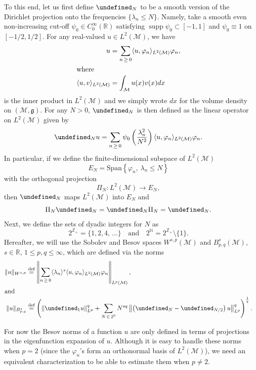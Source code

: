 \documentclass[10pt]{amsart}
\theoremstyle{definition}\newtheorem{defi}[theo]{Definition}\newtheorem{rema}[theo]{Remark}\newtheorem{exam}[theo]{Example}\newtheorem{exem}[theo]{Example}\newtheorem{nota}[theo]{Notation}
\newcommand{\Z}{\mathbb{Z}}
\newcommand{\R}{\mathbb{R}}
\newcommand{\N}{\mathbb{N}}
\DeclareMathOperator*{\supp}{supp}
\newcommand{\deff}{\overset{\textup{def}}{=}}
\let\P= \undefined
\newcommand{\P}{\mathbf{P}}
\newcommand{\M}{\mathcal{M}}
\newcommand{\Span}{\mathrm{Span}}
\newcommand{\g}{\mathfrak{g}}
\newcommand{\jb}[1] {\langle #1 \rangle}
\begin{document}
To this end, let us first define $\P_N$ to be a smooth version of the Dirichlet projection onto the frequencies $\{\lambda_n\leq N\}$. Namely, take a smooth even non-increasing cut-off $\psi_0\in C_0^{\infty}(\R)$ satisfying $\supp \psi_0 \subset [-1,1]$ and $\psi_0\equiv 1$ on $[-1/2,1/2]$. For any real-valued $u\in L^2(\M)$, we have
\begin{align*}
u &= \sum_{n\,\geq\,0}\langle u,\varphi_n\rangle_{L^2(\M)}\varphi_n,
\\
\intertext{where}
\langle u,v\rangle_{L^2(\M)} &= \int_{\M}u(x)v(x)dx
\end{align*}
is the inner product in $L^2(\M)$ and we simply wrote $dx$ for the volume density on $(\M,\g)$. For any $N>0$, $\P_N$ is then defined as the linear operator on $L^2(\M)$ given by
\begin{equation}\label{def-P}
\P_Nu = \sum_{n\,\geq\,0} \psi_0\left(\frac{\lambda_n^2}{N^2}\right)\langle u,\varphi_n\rangle_{L^2(\M)}\varphi_n.
\end{equation}
In particular, if we define the finite-dimensional subspace of $L^2(\M)$
\begin{equation*}
E_N = \Span\left\{\varphi_n,~\lambda_n \leq N\right\}
\end{equation*}
with the orthogonal projection
\begin{equation*}
\Pi_N: L^2(\M)\rightarrow E_N,
\end{equation*}
then $\P_N$ maps $L^2(\M)$ into $E_N$ and
\begin{equation}\label{prop-PiN}
\Pi_N\P_N = \P_N\Pi_N = \P_N.
\end{equation}
Next, we define the sets of dyadic integers for $N$ as
\begin{equation*}
2^{\Z_+} = \{1,2,4,\,\dots\} \quad\text{and}\quad 2^{\N}=2^{\Z_+}\setminus\{1\}.
\end{equation*}
Hereafter, we will use the Sobolev and Besov spaces $W^{s,p}(\M)$ and $B^{s}_{p,q}(\M)$, $s\in\R$, $1\leq p,q\leq \infty$, which are defined via the norms
\begin{align*}
\|u\|_{W^{s,p}}
&\deff \left\|\sum_{n\,\geq\,0} \jb{\lambda_n}^s\langle u,\varphi_n\rangle_{L^2(\M)}\varphi_n\right\|_{L^p(\M)},
\\
\intertext{and}
\|u\|_{B^s_{p,q}}
&\deff \left(\left\|\P_1 u\right\|_{L^{p}}^q+\sum_{N\,\in\,2^{\N}}N^{sq}\left\|\left(\P_N-\P_{N/2}\right) u\right\|_{L^{p} }^q\right)^{\frac1q}.
\end{align*}

For now the Besov norms of a function $u$ are only defined in terms of projections in the eigenfunction expansion of $u$. Although it is easy to handle these norms when $p=2$ (since the $\varphi_n$'s form an orthonormal basis of $L^2(\M)$), we need an equivalent characterization to be able to estimate them when $p\neq 2$.
\end{document}
